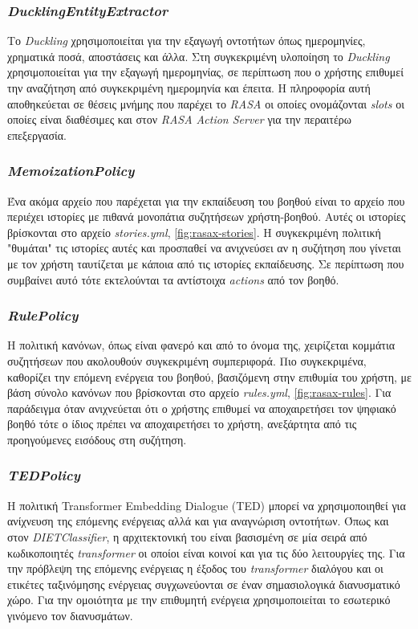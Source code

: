 \subsubsection{\emph{DucklingEntityExtractor}}
Το \emph{Duckling} χρησιμοποιείται για την εξαγωγή οντοτήτων όπως ημερομηνίες, χρηματικά ποσά, αποστάσεις και άλλα. Στη συγκεκριμένη υλοποίηση το \emph{Duckling} χρησιμοποιείται για την εξαγωγή ημερομηνίας, σε περίπτωση που ο χρήστης επιθυμεί την αναζήτηση από συγκεκριμένη ημερομηνία και έπειτα. Η πληροφορία αυτή αποθηκεύεται σε θέσεις μνήμης που παρέχει το \emph{RASA} οι οποίες ονομάζονται \emph{slots} οι οποίες είναι διαθέσιμες και στον \emph{RASA Action Server} για την περαιτέρω επεξεργασία. 

\subsubsection{\emph{MemoizationPolicy}}
Ένα ακόμα αρχείο που παρέχεται για την εκπαίδευση του βοηθού είναι το αρχείο που περιέχει ιστορίες με πιθανά μονοπάτια συζητήσεων χρήστη-βοηθού. Αυτές οι ιστορίες βρίσκονται στο αρχείο \emph{stories.yml}, \autoref{fig:rasax-stories}. Η συγκεκριμένη πολιτική "θυμάται" τις ιστορίες αυτές και προσπαθεί να ανιχνεύσει αν η συζήτηση που γίνεται με τον χρήστη ταυτίζεται με κάποια από τις ιστορίες εκπαίδευσης. Σε περίπτωση που συμβαίνει αυτό τότε εκτελούνται τα αντίστοιχα \emph{actions} από τον βοηθό.

\subsubsection{\emph{RulePolicy}}
Η πολιτική κανόνων, όπως είναι φανερό και από το όνομα της, χειρίζεται κομμάτια συζητήσεων που ακολουθούν συγκεκριμένη συμπεριφορά. Πιο συγκεκριμένα, καθορίζει την επόμενη ενέργεια του βοηθού, βασιζόμενη στην επιθυμία του χρήστη, με βάση σύνολο κανόνων που βρίσκονται στο αρχείο \emph{rules.yml}, \autoref{fig:rasax-rules}. Για παράδειγμα όταν ανιχνεύεται ότι ο χρήστης επιθυμεί να αποχαιρετήσει τον ψηφιακό βοηθό τότε ο ίδιος πρέπει να αποχαιρετήσει το χρήστη, ανεξάρτητα από τις προηγούμενες εισόδους στη συζήτηση.

\subsubsection{\emph{TEDPolicy}}
Η πολιτική Transformer Embedding Dialogue \cite{TEDPOLICY} (TED) μπορεί να χρησιμοποιηθεί για ανίχνευση της επόμενης ενέργειας αλλά και για αναγνώριση οντοτήτων. Όπως και στον \emph{DIETClassifier}, η αρχιτεκτονική του είναι βασισμένη σε μία σειρά από κωδικοποιητές  \emph{transformer} οι οποίοι είναι κοινοί και για τις δύο λειτουργίες της. Για την πρόβλεψη της επόμενης ενέργειας η έξοδος του \emph{transformer} διαλόγου και οι ετικέτες ταξινόμησης ενέργειας συγχωνεύονται σε έναν σημασιολογικά διανυσματικό χώρο. Για την ομοιότητα με την επιθυμητή ενέργεια χρησιμοποιείται το εσωτερικό γινόμενο τον διανυσμάτων.

